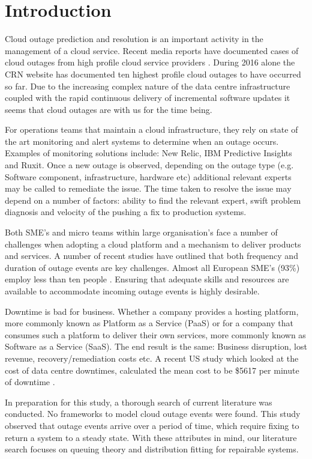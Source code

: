 \documentclass[5p]{elsarticle}
\begin{document}
\linenumbers

\section{Introduction}
Cloud outage prediction and resolution is an important activity in the management of a cloud service. Recent media reports have documented cases of cloud outages from high profile cloud service providers \cite{CRN2016outage}. During 2016 alone the CRN website has documented ten highest profile cloud outages to have occurred so far.  Due to the increasing complex nature of the data centre infrastructure coupled with the rapid continuous delivery of incremental software updates it seems that cloud outages are with us for the time being.

For operations teams that maintain a cloud infrastructure, they rely on state of the art monitoring and alert systems to determine when an outage occurs. Examples of monitoring solutions include: New Relic, IBM Predictive Insights and Ruxit. Once a new outage is observed, depending on the outage type (e.g. Software component, infrastructure, hardware etc) additional relevant experts may be called to remediate the issue. The time taken to resolve the issue may depend on a number of factors: ability to find the relevant expert, swift problem diagnosis and velocity of the pushing a fix to production systems. 

Both SME's and micro teams within large organisation's face a number of challenges when adopting a cloud platform and a mechanism to deliver products and services. A number of recent studies have outlined that both frequency and duration of outage events are key challenges. Almost all European SME's (93\%) employ less than ten people \cite{europa2015sme}. Ensuring that adequate skills and resources are available to accommodate incoming outage events is highly desirable.

Downtime is bad for business. Whether a company provides a hosting platform, more commonly known as Platform as a Service (PaaS) or for a company that consumes such a platform to deliver their own services, more commonly known as Software as a Service (SaaS). The end result is the same: Business disruption, lost revenue, recovery/remediation costs etc. A recent US study which looked at the cost of data centre downtimes, calculated the mean cost to be \$5617 per minute of downtime \cite{DCcost}.

In preparation for this study, a thorough search of current literature was conducted. No frameworks to model cloud outage events were found. This study observed that outage events arrive over a period of time, which require fixing to return a system to a steady state. With these attributes in mind, our literature search focuses on  
queuing theory and distribution fitting for repairable systems.
\end{document}
